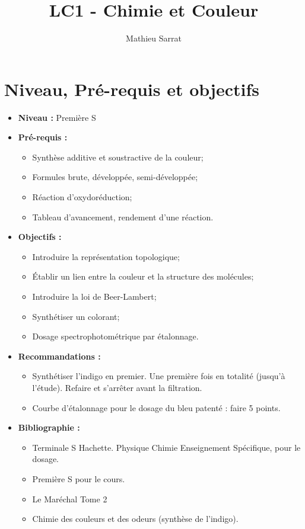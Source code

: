 \documentclass[11pt,a4paper]{report}
\author{Mathieu Sarrat}
\title{LC1 - Chimie et Couleur}
\begin{document}
\maketitle

\section*{Niveau, Pré-requis et objectifs}
\begin{itemize}
	\item \textbf{Niveau :} Première S\\
	
	\item \textbf{Pré-requis :}
	\begin{itemize}
		\item Synthèse additive et soustractive de la couleur;
		\item Formules brute, développée, semi-développée;
		\item Réaction d'oxydoréduction;
		\item Tableau d'avancement, rendement d'une réaction.\\
	\end{itemize}
	
	\item \textbf{Objectifs :}
	\begin{itemize}
		\item Introduire la représentation topologique;
		\item Établir un lien entre la couleur et la structure des molécules;
		\item Introduire la loi de Beer-Lambert;
		\item Synthétiser un colorant;
		\item Dosage spectrophotométrique par étalonnage.\\
	\end{itemize}
		
	\item \textbf{Recommandations :}
	\begin{itemize}
		\item Synthétiser l'indigo en premier. Une première fois en totalité (jusqu'à l'étude). Refaire 		et s'arrêter avant la filtration.
		\item Courbe d'étalonnage pour le dosage du bleu patenté : faire 5 points.\\
	\end{itemize}
	
	\item \textbf{Bibliographie :}
	\begin{itemize}
		\item Terminale S Hachette. Physique Chimie Enseignement Spécifique, pour le dosage.
		\item Première S pour le cours.
		\item Le Maréchal Tome 2
		\item Chimie des couleurs et des odeurs (synthèse de l'indigo).
	\end{itemize}
\end{itemize}
\end{document}

